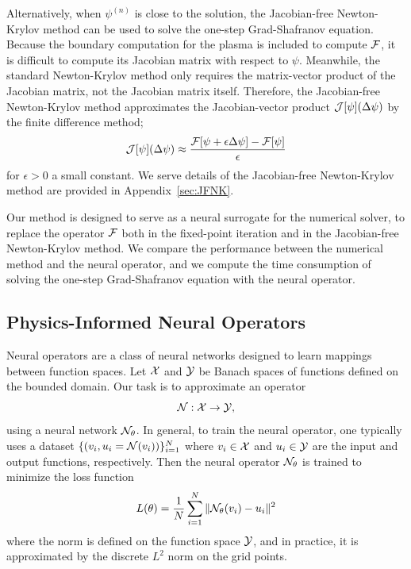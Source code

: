 Alternatively, when $\psi^{(n)}$ is close to the solution, 
the Jacobian-free Newton-Krylov method can be used to solve the one-step Grad-Shafranov equation.
Because the boundary computation for the plasma is included to compute $\cal{F}$,
it is difficult to compute its Jacobian matrix with respect to $\psi$.
Meanwhile, the standard Newton-Krylov method only requires the matrix-vector product of the Jacobian matrix, not the Jacobian matrix itself.
Therefore, the Jacobian-free Newton-Krylov method approximates 
the Jacobian-vector product $\cal{J}[\psi](\Delta \psi)$ 
by the finite difference method;
\[ \cal{J}[\psi](\Delta \psi) \approx 
\frac{\cal{F}[\psi + \epsilon \Delta \psi] - \cal{F}[\psi]}{\epsilon} \]
for $\epsilon > 0$ a small constant.
We serve details of the Jacobian-free Newton-Krylov method are provided in Appendix~\ref{sec:JFNK}.

Our method is designed to serve as a neural surrogate 
for the numerical solver, to replace the operator $\cal{F}$ 
both in the fixed-point iteration and in the Jacobian-free Newton-Krylov method.
We compare the performance between the numerical method
and the neural operator, and we compute the time consumption of solving the one-step Grad-Shafranov equation
with the neural operator. 

\subsection{Physics-Informed Neural Operators}

Neural operators \cite{DeepONet,FNO} are a class of neural networks designed to learn mappings between function spaces.
Let $\cal{X}$ and $\cal{Y}$ be Banach spaces of functions defined on the bounded domain. 
Our task is to approximate an operator 
\[ \cal{N}: \cal{X} \to \cal{Y}, \]
using a neural network $\cal{N}_\theta$.
In general, to train the neural operator, one typically uses a dataset 
$\{(v_i, u_i = \cal{N}(v_i)) \}_{i=1}^N$ where $v_i \in \cal{X}$ and $u_i \in \cal{Y}$ 
are the input and output functions, respectively.
Then the neural operator $\cal{N}_\theta$ is trained to minimize the loss function 
\[ L(\theta) = \frac{1}{N}\sum_{i=1}^N \|\cal{N}_\theta(v_i) - u_i \|^2 \]
where the norm is defined on the function space $\cal{Y}$, and in practice, 
it is approximated by the discrete $L^2$ norm on the grid points.

